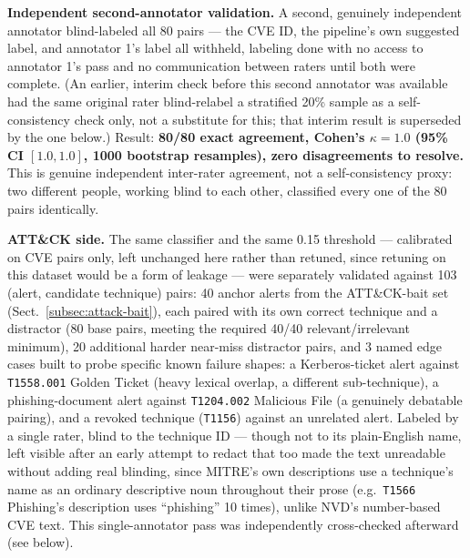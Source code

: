 \documentclass[pdflatex,sn-mathphys-num]{sn-jnl}%
\begin{document}
\textbf{Independent second-annotator validation.} A second, genuinely
independent annotator blind-labeled all 80 pairs --- the CVE ID, the
pipeline's own suggested label, and annotator 1's label all withheld,
labeling done with no access to annotator 1's pass and no communication
between raters until both were complete. (An earlier, interim check
before this second annotator was available had the same original rater
blind-relabel a stratified 20\% sample as a self-consistency check
only, not a substitute for this; that interim result is superseded by
the one below.) Result: \textbf{80/80 exact agreement, Cohen's
$\kappa=1.0$ (95\% CI $[1.0,1.0]$, 1000 bootstrap resamples), zero
disagreements to resolve.} This is genuine independent inter-rater
agreement, not a self-consistency proxy: two different people, working
blind to each other, classified every one of the 80 pairs identically.

\textbf{ATT\&CK side.} The same classifier and the same 0.15 threshold
--- calibrated on CVE pairs only, left unchanged here rather than
retuned, since retuning on this dataset would be a form of leakage ---
were separately validated against 103 (alert, candidate technique)
pairs: 40 anchor alerts from the ATT\&CK-bait set
(Sect.~\ref{subsec:attack-bait}), each paired with its own correct
technique and a distractor (80 base pairs, meeting the required 40/40
relevant/irrelevant minimum), 20 additional harder near-miss distractor
pairs, and 3 named edge cases built to probe specific known failure
shapes: a Kerberos-ticket alert against \texttt{T1558.001} Golden
Ticket (heavy lexical overlap, a different sub-technique), a
phishing-document alert against \texttt{T1204.002} Malicious File (a
genuinely debatable pairing), and a revoked technique
(\texttt{T1156}) against an unrelated alert. Labeled by a single rater,
blind to the technique ID --- though not to its plain-English name,
left visible after an early attempt to redact that too made the text
unreadable without adding real blinding, since MITRE's own descriptions
use a technique's name as an ordinary descriptive noun throughout their
prose (e.g.\ \texttt{T1566} Phishing's description uses ``phishing'' 10
times), unlike NVD's number-based CVE text. This single-annotator pass
was independently cross-checked afterward (see below).
\end{document}
